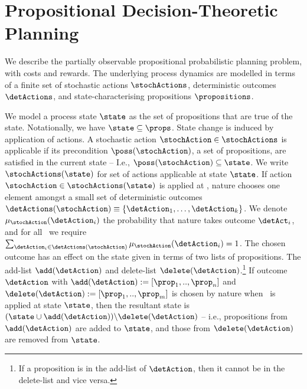 \documentclass[letterpaper]{article}
\begin{document}
\section{Propositional Decision-Theoretic Planning}



We describe the partially observable propositional probabilistic
planning problem, with costs and rewards. The underlying process
dynamics are modelled in terms of a finite set of stochastic actions
$\stochActions$, deterministic outcomes $\detActions$, and
state-characterising propositions $\propositions$.

We model a process state $\state$ as the set of propositions that are
true of the state. Notationally, we have $\state \subseteq
\props$. State change is induced by application of actions. A
stochastic action $\stochAction \in \stochActions$ is applicable if
its precondition $\poss(\stochAction)$, a set of propositions, are
satisfied in the current state -- I.e., $\poss(\stochAction) \subseteq
\state$. We write $\stochActions(\state)$ for set of actions
applicable at state $\state$.  If action $\stochAction \in
\stochActions(\state)$ is applied at \state, nature chooses one
element amongst a small set of deterministic outcomes
$\detActions(\stochAction) \equiv \{\detAction_1, \ldots, \detAction_k
\}$. We denote $\mu_{\stochAction}(\detAction_i)$ the probability that
nature takes outcome $\detAct_i$, and for all \stochAction\ we require
$\sum_{\detAction_i \in \detActions(\stochAction)}
\mu_{\stochAction}(\detAction_i) = 1$. The chosen outcome has an
effect on the state given in terms of two lists of propositions. The
add-list $\add(\detAction)$ and delete-list
$\delete(\detAction)$.\footnote{If a proposition is in the add-list of
$\detAction$, then it cannot be in the delete-list and vice versa.}
If outcome $\detAction$ with $\add(\detAction) := [\prop_1,
..,\prop_n]$ and $\delete(\detAction) := [\prop_1, ..,\prop_m]$ is
chosen by nature when \stochAction\ is applied at state $\state$, then
the resultant state is $ ( \state \cup \add(\detAction) ) \backslash
\delete(\detAction)$ -- i.e., propositions from $\add(\detAction)$ are
added to $\state$, and those from $\delete(\detAction)$ are removed
from $\state$.
\end{document}
